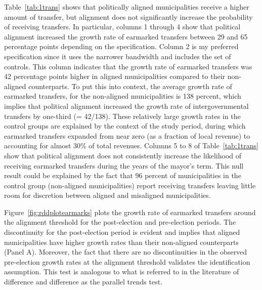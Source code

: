 \documentclass[dv_diss_main.tex]{subfiles}
\begin{document}
Table~\ref{tab:1trans} shows that politically aligned municipalities receive a higher amount of transfer, but alignment does not significantly increase the probability of receiving transfers. In particular, columns 1 through 4 show that political alignment increased the growth rate of earmarked transfers between 29 and 65 percentage points depending on the specification. Column 2 is my preferred specification since it uses the narrower bandwidth and includes the set of controls. This column indicates that the growth rate of earmarked transfers was 42 percentage points higher in aligned municipalities compared to their non-aligned counterparts. To put this into context, the average growth rate of earmarked transfers, for the non-aligned municipalities is 138 percent, which implies that political alignment increased the growth rate of intergovernmental transfers by one-third (= 42/138). These relatively large growth rates in the control groups are explained by the context of the study period, during which earmarked transfers expanded from near zero (as a fraction of local revenue) to accounting for almost 30\% of total revenues. 
Columns 5 to 8 of Table~\ref{tab:1trans} show that political alignment does not consistently increase the likelihood of receiving earmarked transfers during the years of the mayor's term. 
This null result could be explained by the fact that 96 percent of municipalities in the control group (non-aligned municipalities) report receiving transfers leaving little room for discretion between aligned and misaligned municipalities. 

Figure~\ref{fig:rddplotearmarks}  plots the growth rate of earmarked transfers around the alignment threshold for the post-election and pre-election periods. The discontinuity for the post-election period is evident and implies that aligned municipalities have higher growth rates than their non-aligned counterparts (Panel A). Moreover, the fact that there are no discontinuities in the observed pre-election growth rates at the alignment threshold validates the identification assumption. This test is analogous to what is referred to in the literature of difference and difference as the parallel trends test. 


\end{document}
